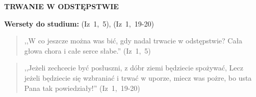 \documentclass[10pt,a4paper,oneside]{article}
\begin{document}
\centerline{\textbf{\MakeUppercase{Trwanie w odstępstwie}}}
\begin{center}
\textbf{Wersety do studium:} (Iz~1,~5), (Iz~1,~19-20)
\end{center}
\begin{quote}
,,W co jeszcze można was bić, gdy nadal trwacie w odstępstwie? Cała głowa chora i całe serce słabe.'' (Iz~1,~5)
\end{quote}
\begin{quote}
,,Jeżeli zechcecie być posłuszni, z dóbr ziemi będziecie spożywać, Lecz jeżeli będziecie się wzbraniać i trwać w uporze, miecz was pożre, bo usta Pana tak powiedziały!'' (Iz~1,~19-20)
\end{quote}
\end{document}
